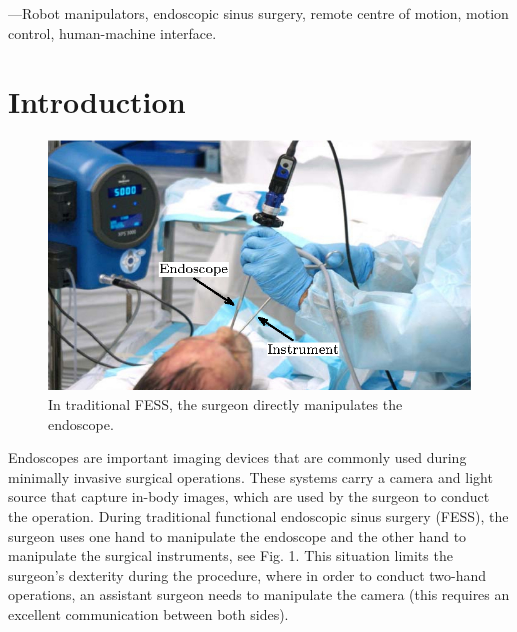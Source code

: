 \documentclass[journal,twoside]{IEEEtran}
\theoremstyle{definition}
\begin{document}
\begin{IEEEkeywords}
---Robot manipulators, endoscopic sinus surgery, remote centre of motion, motion control, human-machine interface. 
\end{IEEEkeywords}
\IEEEpeerreviewmaketitle

\section{Introduction}

\begin{figure}[t]
\centering
\includegraphics[scale = 1]{fig1}
\caption{In traditional FESS, the surgeon directly manipulates the endoscope.}
\label{fig:traditional_surgery}
\end{figure}
Endoscopes are important imaging devices that are commonly used during minimally invasive surgical operations.
These systems carry a camera and light source that capture in-body images, which are used by the surgeon to conduct
the operation. During traditional functional endoscopic sinus
surgery (FESS), the surgeon uses one hand to manipulate
the endoscope and the other hand to manipulate the surgical
instruments, see Fig. 1. This situation limits the surgeon’s
dexterity during the procedure, where in order to conduct
two-hand operations, an assistant surgeon needs to manipulate the camera (this requires an excellent communication
between both sides). 
\end{document}
